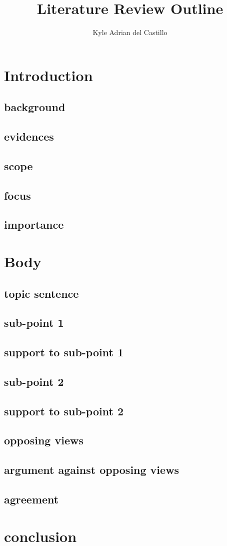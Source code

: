 \documentclass{article}
\title{Literature Review Outline}
\author{Kyle Adrian del Castillo}
\begin{document}
\maketitle


\section{Introduction}
\subsection*{background}

\subsection*{evidences}
\subsection*{scope}
\subsection*{focus}
\subsection*{importance}


\section{Body}
\subsection*{topic sentence}

\subsection*{sub-point 1}
\subsection*{support to sub-point 1}

\subsection*{sub-point 2}
\subsection*{support to sub-point 2}

\subsection*{opposing views}

\subsection*{argument against opposing views}

\subsection*{agreement}


\section{conclusion}
\end{document}

